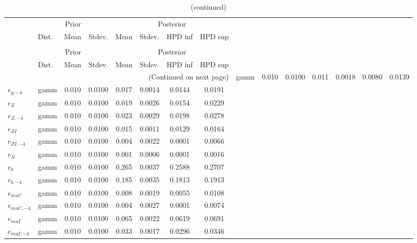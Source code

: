  
\begin{center}
\begin{longtable}{llcccccc} 
\caption{Results from Metropolis-Hastings (standard deviation of structural shocks)}
 \label{Table:MHPosterior:2}\\
\toprule 
  & \multicolumn{3}{c}{Prior}  &  \multicolumn{4}{c}{Posterior} \\
  \cmidrule(r{.75em}){2-4} \cmidrule(r{.75em}){5-8}
  & Dist. & Mean  & Stdev. & Mean & Stdev. & HPD inf & HPD sup\\
\midrule \endfirsthead 
\caption{(continued)}\\\toprule 
  & \multicolumn{3}{c}{Prior}  &  \multicolumn{4}{c}{Posterior} \\
  \cmidrule(r{.75em}){2-4} \cmidrule(r{.75em}){5-8}
  & Dist. & Mean  & Stdev. & Mean & Stdev. & HPD inf & HPD sup\\
\midrule \endhead 
\bottomrule \multicolumn{8}{r}{(Continued on next page)} \endfoot 
\bottomrule \endlastfoot 
${e_g}$ & gamm &   0.010 & 0.0100 &   0.011& 0.0018 &  0.0080 &  0.0139 \\ 
${e_{g,-4}}$ & gamm &   0.010 & 0.0100 &   0.017& 0.0014 &  0.0144 &  0.0191 \\ 
${e_Z}$ & gamm &   0.010 & 0.0100 &   0.019& 0.0026 &  0.0154 &  0.0229 \\ 
${e_{Z,-4}}$ & gamm &   0.010 & 0.0100 &   0.023& 0.0029 &  0.0198 &  0.0278 \\ 
${e_{ZI}}$ & gamm &   0.010 & 0.0100 &   0.015& 0.0011 &  0.0129 &  0.0164 \\ 
${e_{ZI,-4}}$ & gamm &   0.010 & 0.0100 &   0.004& 0.0022 &  0.0001 &  0.0066 \\ 
${e_N}$ & gamm &   0.010 & 0.0100 &   0.001& 0.0006 &  0.0001 &  0.0016 \\ 
${e_b}$ & gamm &   0.010 & 0.0100 &   0.265& 0.0037 &  0.2588 &  0.2707 \\ 
${e_{b,-4}}$ & gamm &   0.010 & 0.0100 &   0.185& 0.0035 &  0.1813 &  0.1913 \\ 
${e_{muC}}$ & gamm &   0.010 & 0.0100 &   0.008& 0.0019 &  0.0055 &  0.0108 \\ 
${e_{muC,-4}}$ & gamm &   0.010 & 0.0100 &   0.004& 0.0027 &  0.0001 &  0.0074 \\ 
${e_{muI}}$ & gamm &   0.010 & 0.0100 &   0.065& 0.0022 &  0.0619 &  0.0691 \\ 
${e_{muI,-4}}$ & gamm &   0.010 & 0.0100 &   0.033& 0.0017 &  0.0296 &  0.0346 \\ 
\end{longtable}
 \end{center}
